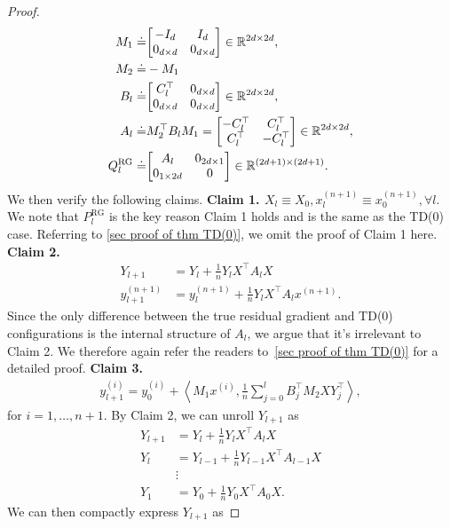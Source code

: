 \documentclass{article}
\newcommand{\R}{\mathbb{R}}
\newcommand{\indot}[2]{{\left<#1, #2\right>}}
\newcommand{\rg}{\text{RG}}
\begin{document}
\begin{proof}
    \begin{align}
      M_1 \doteq& \mqty[-I_{d} & I_{d} \\
                        0_{d \times d} & 0_{d \times d}] \in \R^{2d \times 2d},\\
      M_2 \doteq& -M_1\\
      B_l \doteq& \mqty[C_l^\top & 0_{d\times d} \\
                        0_{d \times d} & 0_{d \times d}] \in \R^{2d \times 2d},\\
      A_l \doteq& M_2^\top B_l M_1  = \mqty[-C_l^\top & C_l^\top \\
                                            C_l^\top & -C_l^\top] \in \R^{2d \times 2d},\\
      Q_l^{\rg} \doteq& \mqty[A_l & 0_{2d \times 1} \\ 0_{1 \times 2d} & 0] \in \R^{(2d + 1) \times (2d+1)}.
    \end{align}
    We then verify the following claims.
    \textbf{Claim 1. $X_l \equiv X_0 , x_l^{(n+1)} \equiv x_0^{(n+1)}, \forall l.$}
    We note that $P_l^{\rg}$ is the key reason Claim 1 holds and is the same as the TD(0) case.
    Referring to \ref{sec proof of thm TD(0)}, we omit the proof of Claim 1 here.
    \textbf{Claim 2.}
    \begin{align}
        Y_{l+1} &= Y_l + \frac{1}{n} Y_l X^\top A_l X\\
        y_{l+1}^{(n+1)} &= y_l^{(n+1)} + \frac{1}{n} Y_l X^\top A_l x^{(n+1)}.
    \end{align}
    Since the only difference between the true residual gradient and TD(0) configurations is the internal structure of $A_l$, we argue that it's irrelevant to Claim 2.
    We therefore again refer the readers to~\ref{sec proof of thm TD(0)} for a detailed proof.
    \textbf{Claim 3.}
    \begin{align}
      y_{l+1}^{(i)} = y_0^{(i)} + \indot{M_1 x^{(i)}}{\frac{1}{n}\sum_{j=0}^l B_j^\top M_2 X Y_j^\top},
    \end{align}
    for $i = 1, \dots, n+1$.
    By Claim 2, we can unroll $Y_{l+1}$ as
    \begin{align}
        Y_{l+1} &= Y_l + \frac{1}{n} Y_l X^\top A_l X\\
        Y_l &= Y_{l-1} + \frac{1}{n} Y_{l-1} X^\top A_{l-1} X\\
         &\vdots\\
        Y_1 & = Y_0 + \frac{1}{n} Y_0 X^\top A_0 X.
    \end{align}
    We can then compactly express $Y_{l+1}$ as

\end{proof}
\end{document}

